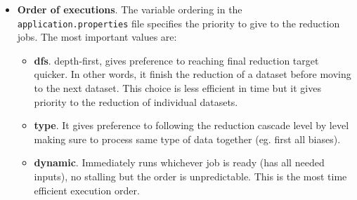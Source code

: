 \begin{itemize}
\begin{itemize}
\end{itemize}

  The optimal configuration depends on the system and on the instrument pipeline (e.g., whether it is parallelized or not).
  
  In case of parallelized pipelines,  we recommend to reserve to \edps\ the full number of cores (minus 1). Set 2 processes in parallel, 
  and default\_omp\_threads to about 1/2 of cores.

  In case of non parallelized pipelines, we recommend to  reserve to \edps\ the full number of cores (minus 1). Set the number of parallel processes as the number of allocated cores, and
  default\_omp\_threads to 1.


\item {\bf Order of executions}.
The variable ordering in the {\tt application.properties} file specifies the priority to give to the
reduction jobs. The most important values are:
\begin{itemize}
  \item {\bf dfs}. depth-first, gives preference to reaching final reduction target quicker. In other words, it
finish the reduction of a dataset before moving to the next dataset. This choice is less efficient
in time but it gives priority to the reduction of individual datasets.
  \item {\bf type}. It gives preference to following the reduction cascade level by level making sure to process same type of data together (eg. first all biases).
  \item {\bf dynamic}. Immediately runs whichever job is ready (has all needed inputs), no stalling but the
order is unpredictable. This is the most time efficient execution order.

\end{itemize}

\end{itemize}
